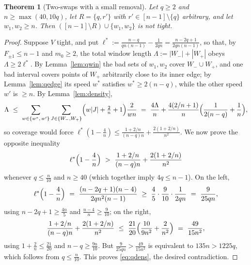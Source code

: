 \documentclass[11pt]{article}
\newtheorem{theorem}{Theorem}[section]
\theoremstyle{definition}
\begin{document}
\begin{theorem}[Two-swaps with a small removal]\label{thm:qsmall}
Let $q\ge2$ and $n\ge\max(40,10q)$, let $R=\{q,r'\}$ with
$r'\in[n-1]\setminus\{q\}$ arbitrary, and let $w_1,w_2\ge n$.  Then
$([n-1]\setminus R)\cup\{w_1,w_2\}$ is not tight.
\end{theorem}

\begin{proof}
Suppose $V$ tight, and put $\ell^*:=\frac{n-q}{qn(n-1)}-\frac1{2qn}
=\frac{n-2q+1}{2qn(n-1)}$, so that, by $F_{\pm1}\le n-1$ and $m_0\ge2$,
the total window length $\Lambda:=|W_-|+|W_+|$ obeys $\Lambda\ge2\ell^*$.
By Lemma~\ref{lem:qwin} the bad sets of $w_1,w_2$ cover $W_-\cup W_+$,
and one bad interval covers points of $W_+$ arbitrarily close to its
inner edge; by Lemma~\ref{lem:qedge} its speed $w^*$ satisfies
$w^*\ge2(n-q)$, while the other speed $w'$ is $\ge n$.  By
Lemma~\ref{lem:density},
\[
\Lambda\ \le\ \sum_{w\in\{w^*,\,w'\}}\sum_{J\in\{W_-,W_+\}}
\Bigl(w|J|+\tfrac2n+1\Bigr)\frac2{wn}
\ =\ \frac{4\Lambda}{n}+\frac{4(2/n+1)}{n}
\Bigl(\frac1{2(n-q)}+\frac1n\Bigr),
\]
so coverage would force
$\ell^*(1-\frac4n)\le\frac{1+2/n}{(n-q)n}+\frac{2(1+2/n)}{n^2}$.  We now
prove the opposite inequality
\begin{equation}\label{eq:qdens}
\ell^*\Bigl(1-\frac4n\Bigr)\ >\
\frac{1+2/n}{(n-q)n}+\frac{2(1+2/n)}{n^2}
\end{equation}
whenever $q\le\frac n{10}$ and $n\ge40$ (which together imply
$4q\le n-1$).  On the left,
\[
\ell^*\Bigl(1-\frac4n\Bigr)
\ =\ \frac{(n-2q+1)(n-4)}{2qn^2(n-1)}
\ \ge\ \frac45\cdot\frac9{10}\cdot\frac1{2qn}
\ =\ \frac9{25qn},
\]
using $n-2q+1\ge\frac{4n}5$ and $\frac{n-4}{n}\ge\frac9{10}$; on the
right,
\[
\frac{1+2/n}{(n-q)n}+\frac{2(1+2/n)}{n^2}
\ \le\ \frac{21}{20}\Bigl(\frac{10}{9n^2}+\frac2{n^2}\Bigr)
\ =\ \frac{49}{15n^2},
\]
using $1+\frac2n\le\frac{21}{20}$ and $n-q\ge\frac{9n}{10}$.  But
$\frac9{25qn}>\frac{49}{15n^2}$ is equivalent to $135n>1225q$, which
follows from $q\le\frac n{10}$.  This proves \eqref{eq:qdens}, the
desired contradiction.
\end{proof}
\end{document}
